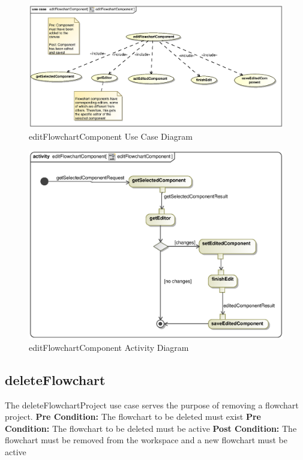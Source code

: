 \documentclass[12pt,a4paper,titlepage]{article}
\begin{document}
\begin{figure}[H]
  \centering
\includegraphics[width=500px]{editFlowchartComponent.eps}
\caption{editFlowchartComponent Use Case Diagram}
\end{figure}

\begin{figure}[H]
  \centering
\includegraphics[width=500px]{editFlowchartComponentActivity.eps}
\caption{editFlowchartComponent Activity Diagram}
\end{figure}

\newpage
\subsection{deleteFlowchart}
The deleteFlowchartProject use case serves the purpose of removing a flowchart project.\newline\newline
\textbf{Pre Condition:} The flowchart to be deleted must exist\newline
\textbf{Pre Condition:} The flowchart to be deleted must be active\newline\newline
\textbf{Post Condition:} The flowchart must be removed from the workspace and a new flowchart must be active
\end{document}
